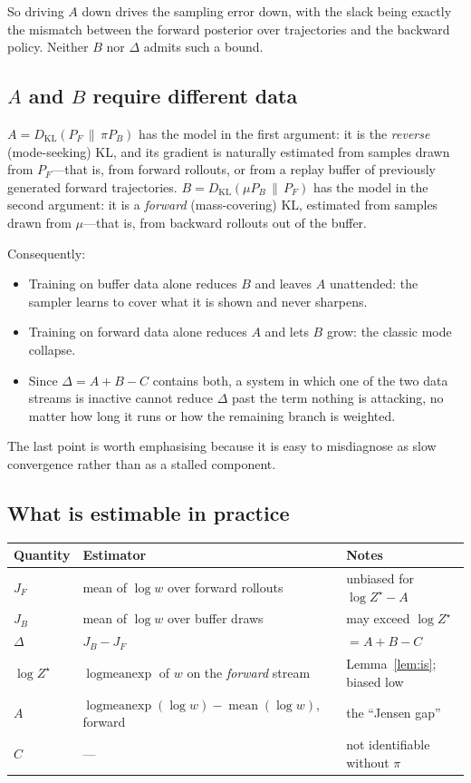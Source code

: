 \documentclass[11pt]{article}
\theoremstyle{plain}
\theoremstyle{definition}
\theoremstyle{remark}
\newcommand{\KL}[2]{D_{\mathrm{KL}}\!\left(#1 \,\middle\|\, #2\right)}
\newcommand{\PF}{P_{F}}
\newcommand{\PB}{P_{B}}
\newcommand{\Zstar}{Z^{\star}}
\newcommand{\JF}{J_{F}}
\newcommand{\JB}{J_{B}}
\begin{document}
So driving $A$ down drives the sampling error down, with the slack being exactly
the mismatch between the forward posterior over trajectories and the backward
policy. Neither $B$ nor $\Delta$ admits such a bound.

\subsection{$A$ and $B$ require different data}

$A = \KL{\PF}{\pi\PB}$ has the model in the first argument: it is the
\emph{reverse} (mode-seeking) KL, and its gradient is naturally estimated from
samples drawn from $\PF$---that is, from forward rollouts, or from a replay buffer
of previously generated forward trajectories. $B = \KL{\mu\PB}{\PF}$ has the model
in the second argument: it is a \emph{forward} (mass-covering) KL, estimated from
samples drawn from $\mu$---that is, from backward rollouts out of the buffer.

Consequently:
\begin{itemize}
  \item Training on buffer data alone reduces $B$ and leaves $A$ unattended: the
        sampler learns to cover what it is shown and never sharpens.
  \item Training on forward data alone reduces $A$ and lets $B$ grow: the classic
        mode collapse.
  \item Since $\Delta = A + B - C$ contains both, a system in which one of the two
        data streams is inactive cannot reduce $\Delta$ past the term nothing is
        attacking, no matter how long it runs or how the remaining branch is
        weighted.
\end{itemize}
The last point is worth emphasising because it is easy to misdiagnose as slow
convergence rather than as a stalled component.

\subsection{What is estimable in practice}

\begin{table}[h]
\centering
\begin{tabular}{@{}lll@{}}
\toprule
Quantity & Estimator & Notes \\
\midrule
$\JF$ & mean of $\log w$ over forward rollouts & unbiased for $\log\Zstar - A$ \\
$\JB$ & mean of $\log w$ over buffer draws & may exceed $\log\Zstar$ \\
$\Delta$ & $\JB - \JF$ & $= A + B - C$ \\
$\log\Zstar$ & $\operatorname{logmeanexp}$ of $w$ on the \emph{forward} stream & Lemma~\ref{lem:is}; biased low \\
$A$ & $\operatorname{logmeanexp}(\log w) - \operatorname{mean}(\log w)$, forward & the ``Jensen gap'' \\
$C$ & --- & not identifiable without $\pi$ \\
\bottomrule
\end{tabular}
\end{table}
\end{document}
